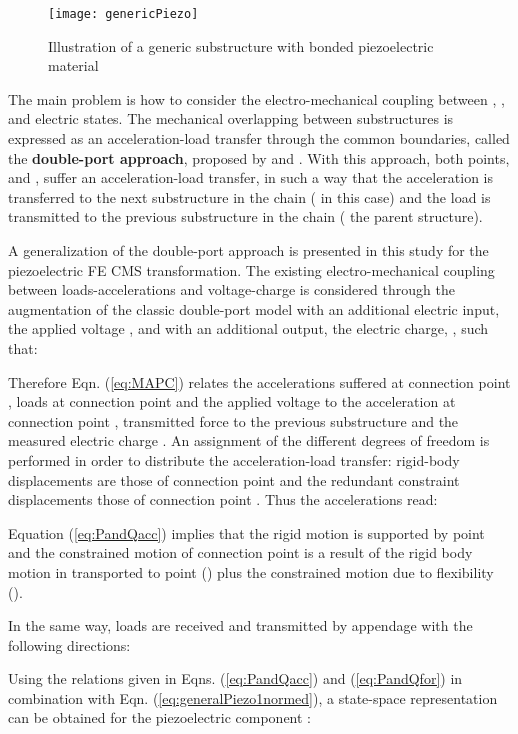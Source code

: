 \documentclass{ifacconf}
\begin{document}
\begin{figure} 
\centering
\texttt{[image: genericPiezo]}
\caption{Illustration of a generic substructure with bonded piezoelectric material}
\label{fig:genericPiezo}
\end{figure}

The main problem is how to consider the electro-mechanical coupling between  , ,  and electric states.  The mechanical overlapping between substructures is expressed as an acceleration-load transfer through the common boundaries, called the \textbf{double-port approach}, proposed by \cite{Alazard2015_LM} and \cite{perez_IFAtheory2015}. With this approach, both points,  and , suffer an acceleration-load transfer, in such a way that the acceleration is transferred to the next substructure in the chain ( in this case) and the load is transmitted to the previous substructure  in the chain ( the parent  structure). 

A generalization of the double-port approach is presented in this study for the piezoelectric FE CMS transformation. The existing electro-mechanical coupling between loads-accelerations and voltage-charge is considered through the augmentation of the classic double-port model with an additional electric input, the applied voltage , and with an additional output, the electric charge, , such that:



Therefore Eqn. (\ref{eq:MAPC}) relates the accelerations suffered at connection point , loads at connection point  and the applied voltage  to the acceleration at connection point , transmitted force to the previous substructure  and the measured electric charge . An assignment of the different degrees of freedom is performed in order to distribute the acceleration-load transfer: rigid-body displacements are those of connection point  and the redundant constraint displacements those of connection point . Thus the accelerations read:



Equation (\ref{eq:PandQacc}) implies that the rigid motion is supported by point  and the constrained motion of connection point  is a result of the rigid body motion in  transported to point  () plus the constrained motion due to flexibility ().

In the same way, loads are received and transmitted by appendage  with the following directions:




Using the relations given in Eqns. (\ref{eq:PandQacc}) and (\ref{eq:PandQfor}) in combination with Eqn. (\ref{eq:generalPiezo1normed}), a state-space representation can be obtained for the piezoelectric component : 
\end{document}
